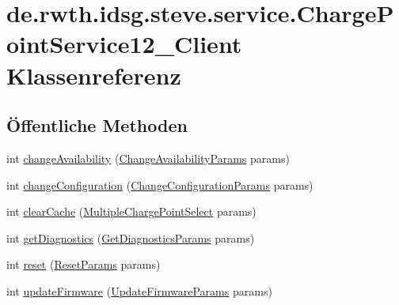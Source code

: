\hypertarget{classde_1_1rwth_1_1idsg_1_1steve_1_1service_1_1_charge_point_service12___client}{\section{de.\+rwth.\+idsg.\+steve.\+service.\+Charge\+Point\+Service12\+\_\+\+Client Klassenreferenz}
\label{classde_1_1rwth_1_1idsg_1_1steve_1_1service_1_1_charge_point_service12___client}
}
\subsection*{Öffentliche Methoden}
\begin{DoxyCompactItemize}
\item 
int \hyperlink{classde_1_1rwth_1_1idsg_1_1steve_1_1service_1_1_charge_point_service12___client_a1a362db6fbdf8a34f7e057c42b4b1e58}{change\+Availability} (\hyperlink{classde_1_1rwth_1_1idsg_1_1steve_1_1web_1_1dto_1_1ocpp12_1_1_change_availability_params}{Change\+Availability\+Params} params)
\item 
int \hyperlink{classde_1_1rwth_1_1idsg_1_1steve_1_1service_1_1_charge_point_service12___client_a2916119c0f47f5c20943d27ff26d1d57}{change\+Configuration} (\hyperlink{classde_1_1rwth_1_1idsg_1_1steve_1_1web_1_1dto_1_1ocpp12_1_1_change_configuration_params}{Change\+Configuration\+Params} params)
\item 
int \hyperlink{classde_1_1rwth_1_1idsg_1_1steve_1_1service_1_1_charge_point_service12___client_a7a72a83bdc6f50bddfbb4183ccb83e54}{clear\+Cache} (\hyperlink{classde_1_1rwth_1_1idsg_1_1steve_1_1web_1_1dto_1_1common_1_1_multiple_charge_point_select}{Multiple\+Charge\+Point\+Select} params)
\item 
int \hyperlink{classde_1_1rwth_1_1idsg_1_1steve_1_1service_1_1_charge_point_service12___client_a61eea2363ea48a32381f15491a453b01}{get\+Diagnostics} (\hyperlink{classde_1_1rwth_1_1idsg_1_1steve_1_1web_1_1dto_1_1common_1_1_get_diagnostics_params}{Get\+Diagnostics\+Params} params)
\item 
int \hyperlink{classde_1_1rwth_1_1idsg_1_1steve_1_1service_1_1_charge_point_service12___client_a5a8d703d7ffea0cf86de21acc618708d}{reset} (\hyperlink{classde_1_1rwth_1_1idsg_1_1steve_1_1web_1_1dto_1_1ocpp12_1_1_reset_params}{Reset\+Params} params)
\item 
int \hyperlink{classde_1_1rwth_1_1idsg_1_1steve_1_1service_1_1_charge_point_service12___client_aa29c473ae9afdb6dff11b2c79577e3cc}{update\+Firmware} (\hyperlink{classde_1_1rwth_1_1idsg_1_1steve_1_1web_1_1dto_1_1common_1_1_update_firmware_params}{Update\+Firmware\+Params} params)

\end{DoxyCompactItemize}
